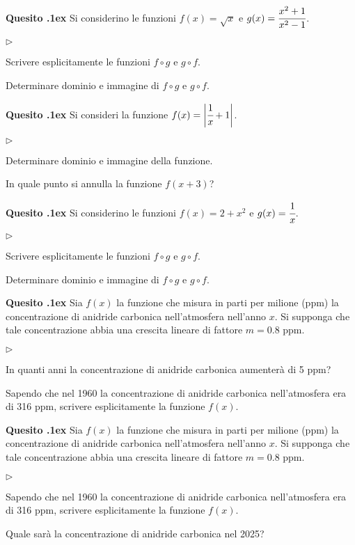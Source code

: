\documentclass[11pt,twoside,a4paper]{article}
\newcommand{\mylabel}[1]{#1\hfill}
\renewenvironment{itemize}
  {\begin{list}{$\triangleright$}{%
   \setlength{\parskip}{0mm}
   \setlength{\topsep}{.4\baselineskip}
   \setlength{\rightmargin}{0mm}
   \setlength{\listparindent}{0mm}
   \setlength{\itemindent}{0mm}
   \setlength{\labelwidth}{2ex}
   \setlength{\itemsep}{.4\baselineskip}
   \setlength{\parsep}{0mm}
   \setlength{\partopsep}{0mm}
   \setlength{\labelsep}{1ex}
   \setlength{\leftmargin}{\labelwidth+\labelsep}
   \let\makelabel\mylabel}}{%
   \end{list}\vspace*{-1.3mm}}
\newcounter{quesito}
\newenvironment{question}{\bigskip\addtocounter{quesito}{1}\bigskip\bigskip\par\textbf{Quesito \thequesito.\kern1ex}}{\vspace{\parskip}}
\begin{document}
\begin{question}
Si considerino le funzioni $f(x) = \sqrt{x}$ e $g(x) = \cfrac{x^2 + 1}{x^2 - 1}$.
\begin{itemize}
\item[1.] Scrivere esplicitamente le funzioni $f \circ g$ e $g \circ f$.
\item[2.] Determinare dominio e immagine di $f \circ g$ e $g \circ f$.
\end{itemize}
\end{question}

\begin{question}
Si consideri la funzione $f(x) = \bigg| \cfrac{1}{x} + 1 \bigg|$.
\begin{itemize}
\item[1.] Determinare dominio e immagine della funzione.
\item[2.] In quale punto si annulla la funzione $f(x+3)$?
\end{itemize}
\end{question}

\begin{question}
Si considerino le funzioni $f(x) = 2 + x^2$ e $g(x) = \cfrac{1}{x}$.
\begin{itemize}
\item[1.] Scrivere esplicitamente le funzioni $f \circ g$ e $g \circ f$.
\item[2.] Determinare dominio e immagine di $f \circ g$ e $g \circ f$.
\end{itemize}
\end{question}

\begin{question}
Sia $f(x)$ la funzione che misura in parti per milione (ppm) la concentrazione di anidride carbonica nell'atmosfera nell'anno $x$. Si supponga che tale concentrazione abbia una crescita lineare di fattore $m = 0.8$ ppm.
\begin{itemize}
\item[1.] In quanti anni la concentrazione di anidride carbonica aumenter\`a di 5 ppm?
\item[2.] Sapendo che nel 1960 la concentrazione di anidride carbonica nell'atmosfera era di 316 ppm, scrivere esplicitamente la funzione $f(x)$.
\end{itemize}
\end{question}

\begin{question}
Sia $f(x)$ la funzione che misura in parti per milione (ppm) la concentrazione di anidride carbonica nell'atmosfera nell'anno $x$. Si supponga che tale concentrazione abbia una crescita lineare di fattore $m = 0.8$ ppm.
\begin{itemize}
\item[1.] Sapendo che nel 1960 la concentrazione di anidride carbonica nell'atmosfera era di 316 ppm, scrivere esplicitamente la funzione $f(x)$.
\item[2.] Quale sar\`a la concentrazione di anidride carbonica nel 2025?
\end{itemize}
\end{question}
\end{document}
